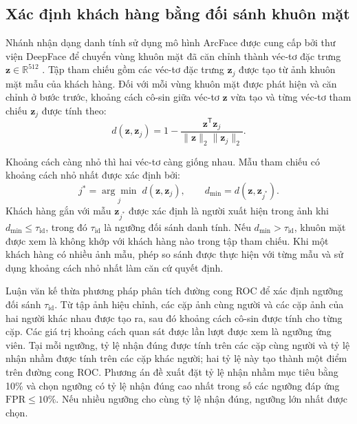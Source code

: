 \documentclass[../LuanVan.tex]{subfiles}
\begin{document}
\subsection{Xác định khách hàng bằng đối sánh khuôn mặt}
\label{subsection:3.2.4}

Nhánh nhận dạng danh tính sử dụng mô hình ArcFace được cung cấp bởi thư viện DeepFace để chuyển vùng khuôn mặt đã căn chỉnh thành véc-tơ đặc trưng $\boldsymbol{z}\in\mathbb{R}^{512}$ \cite{deng2019arcface}. Tập tham chiếu gồm các véc-tơ đặc trưng $\boldsymbol{z}_j$ được tạo từ ảnh khuôn mặt mẫu của khách hàng. Đối với mỗi vùng khuôn mặt được phát hiện và căn chỉnh ở bước trước, khoảng cách cô-sin giữa véc-tơ $\boldsymbol{z}$ vừa tạo và từng véc-tơ tham chiếu $\boldsymbol{z}_j$ được tính theo:
\begin{equation}
    d(\boldsymbol{z},\boldsymbol{z}_j)
    =1-\frac{\boldsymbol{z}^{\mathsf T}\boldsymbol{z}_j}
    {\lVert\boldsymbol{z}\rVert_2\lVert\boldsymbol{z}_j\rVert_2}.
    \label{eq:ch3_identity_distance}
\end{equation}

Khoảng cách càng nhỏ thì hai véc-tơ càng giống nhau. Mẫu tham chiếu có khoảng cách nhỏ nhất được xác định bởi:
\begin{equation}
    j^{*}=\underset{j}{\arg\min}\;d(\boldsymbol{z},\boldsymbol{z}_j),
    \qquad d_{\min}=d(\boldsymbol{z},\boldsymbol{z}_{j^{*}}).
    \label{eq:ch3_identity_nearest}
\end{equation}
Khách hàng gắn với mẫu $\boldsymbol{z}_{j^{*}}$ được xác định là người xuất hiện trong ảnh khi $d_{\min}\leq\tau_{\mathrm{id}}$, trong đó $\tau_{\mathrm{id}}$ là ngưỡng đối sánh danh tính. Nếu $d_{\min}>\tau_{\mathrm{id}}$, khuôn mặt được xem là không khớp với khách hàng nào trong tập tham chiếu. Khi một khách hàng có nhiều ảnh mẫu, phép so sánh được thực hiện với từng mẫu và sử dụng khoảng cách nhỏ nhất làm căn cứ quyết định.

Luận văn kế thừa phương pháp phân tích đường cong ROC \cite{fawcett2006roc} để xác định ngưỡng đối sánh $\tau_{\mathrm{id}}$. Từ tập ảnh hiệu chỉnh, các cặp ảnh cùng người và các cặp ảnh của hai người khác nhau được tạo ra, sau đó khoảng cách cô-sin được tính cho từng cặp. Các giá trị khoảng cách quan sát được lần lượt được xem là ngưỡng ứng viên. Tại mỗi ngưỡng, tỷ lệ nhận đúng được tính trên các cặp cùng người và tỷ lệ nhận nhầm được tính trên các cặp khác người; hai tỷ lệ này tạo thành một điểm trên đường cong ROC. Phương án đề xuất đặt tỷ lệ nhận nhầm mục tiêu bằng 10\% và chọn ngưỡng có tỷ lệ nhận đúng cao nhất trong số các ngưỡng đáp ứng $\mathrm{FPR}\leq10\%$. Nếu nhiều ngưỡng cho cùng tỷ lệ nhận đúng, ngưỡng lớn nhất được chọn.
\end{document}

